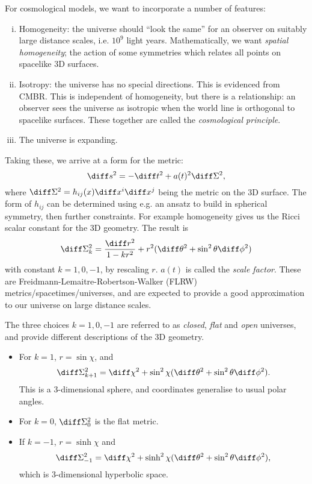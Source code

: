 \documentclass[12pt]{article}
\begin{document}
For cosmological models, we want to incorporate a number of features:
\begin{enumerate}[(i)]
	\item Homogeneity: the universe should ``look the same'' for an observer on suitably large distance scales, i.e. $10^{9}$ light years. Mathematically, we want \emph{spatial homogeneity}; the action of some symmetries which relates all points on spacelike $3$D surfaces.
	\item Isotropy: the universe has no special directions. This is evidenced from CMBR. This is independent of homogeneity, but there is a relationship: an observer sees the universe as isotropic when the world line is orthogonal to spacelike surfaces. These together are called the \emph{cosmological principle}.
	\item The universe is expanding.
\end{enumerate}
Taking these, we arrive at a form for the metric:
\[
\diff s^2 = - \diff t^2 + a(t)^2 \diff \Sigma^2,
\]
where $\diff \Sigma^2 = h_{ij}(x) \diff x^i \diff x^j$ being the metric on the $3$D surface. The form of $h_{ij}$ can be determined using e.g. an ansatz to build in spherical symmetry, then further constraints. For example homogeneity gives us the Ricci scalar constant for the 3D geometry. The result is
\[
\diff \Sigma_k^2 = \frac{\diff r^2}{1 - kr^2} + r^2(\diff \theta^2 + \sin^2\theta \diff \phi^2)
\]
with constant $k = 1, 0, -1$, by rescaling $r$. $a(t)$ is called the \emph{scale factor}. These are Freidmann-Lemaitre-Robertson-Walker (FLRW) metrics/spacetimes/universes, and are expected to provide a good approximation to our universe on large distance scales.

The three choices $k = 1, 0, -1$ are referred to as \emph{closed}, \emph{flat} and \emph{open} universes, and provide different descriptions of the 3D geometry.
\begin{itemize}
	\item For $k = 1$, $r = \sin \chi$, and
		\[
		\diff \Sigma_{k+1}^2 = \diff \chi^2 + \sin^2 \chi(\diff \theta^2 + \sin^2 \theta \diff \phi^2).
		\]
		This is a 3-dimensional sphere, and coordinates generalise to usual polar angles.
	\item For $k = 0$, $\diff \Sigma_0^2$ is the flat metric.
	\item If $k = -1$, $r = \sinh \chi$ and
		\[
		\diff \Sigma_{-1}^2 = \diff \chi^2 + \sinh^2 \chi (\diff \theta^2 + \sin^2 \theta \diff \phi^2),
		\]
		which is 3-dimensional hyperbolic space.
\end{itemize}
\end{document}
